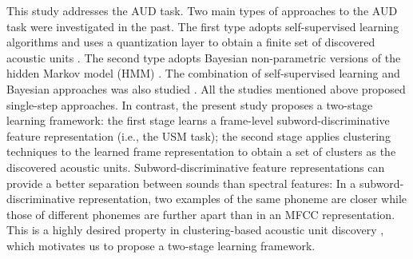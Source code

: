\documentclass[a4paper]{article}
\begin{document}
This study addresses the AUD task. 
Two main types of approaches to  the AUD task were investigated in the past. The first type adopts  self-supervised  learning algorithms and uses a quantization layer to obtain a finite set of discovered acoustic units \cite{oord2017neural,baevski2020vqwav2vec,Niekerk2020vector}. The second type adopts Bayesian non-parametric versions of the hidden Markov model (HMM) \cite{lee2012a,Ondel2019Bayesian,Yusuf2020hierarchical}. The combination of self-supervised learning and Bayesian approaches was also studied \cite{Ebbers2017,ondel2018bayesian}.
All the studies mentioned above proposed single-step approaches. In contrast, the present study proposes a two-stage learning framework: the first stage learns a frame-level subword-discriminative  feature representation  (i.e., the USM task); the second stage  applies clustering techniques to the  learned frame representation to obtain a set of clusters as the discovered acoustic units. 
Subword-discriminative feature representations can provide a better separation between sounds than spectral features: In a subword-discriminative representation,  two   examples of the same phoneme are closer while those of different phonemes are further apart than in an  MFCC representation. This is a    highly desired property in     clustering-based acoustic unit discovery \cite{I3EWang,Bhati2019unsupervised}, which motivates us to propose a two-stage learning framework.


\end{document}
